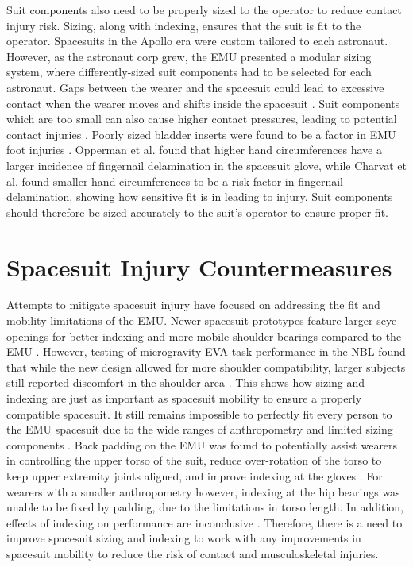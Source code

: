 \documentclass[defaultstyle,11pt]{comps}
\begin{document}
Suit components also need to be properly sized to the operator to reduce contact injury risk.
Sizing, along with indexing, ensures that the suit is fit to the operator.
Spacesuits in the Apollo era were custom tailored to each astronaut.
However, as the astronaut corp grew, the EMU presented a modular sizing system, where differently-sized suit components had to be selected for each astronaut.
Gaps between the wearer and the spacesuit could lead to excessive contact when the wearer moves and shifts inside the spacesuit \citep{Benson2009}.
Suit components which are too small can also cause higher contact pressures, leading to potential contact injuries \citep{Anderson2015b}.
Poorly sized bladder inserts were found to be a factor in EMU foot injuries \citep{Strauss2004}. Opperman et al. \citep{Opperman2010} found that higher hand circumferences have a larger incidence of fingernail delamination in the spacesuit glove, while Charvat et al. \citep{Charvat2015} found smaller hand circumferences to be a risk factor in fingernail delamination, showing how sensitive fit is in leading to injury.
Suit components should therefore be sized accurately to the suit's operator to ensure proper fit.

\hypertarget{spacesuit-injury-countermeasures}{%
\section{Spacesuit Injury Countermeasures}\label{spacesuit-injury-countermeasures}}

Attempts to mitigate spacesuit injury have focused on addressing the fit and mobility limitations of the EMU.
Newer spacesuit prototypes feature larger scye openings for better indexing and more mobile shoulder bearings compared to the EMU \citep{Graziosi2016}.
However, testing of microgravity EVA task performance in the NBL found that while the new design allowed for more shoulder compatibility, larger subjects still reported discomfort in the shoulder area \citep{Meginnis2018}.
This shows how sizing and indexing are just as important as spacesuit mobility to ensure a properly compatible spacesuit.
It still remains impossible to perfectly fit every person to the EMU spacesuit due to the wide ranges of anthropometry and limited sizing components \citep{Benson2009}.
Back padding on the EMU was found to potentially assist wearers in controlling the upper torso of the suit, reduce over-rotation of the torso to keep upper extremity joints aligned, and improve indexing at the gloves \citep{Chappell2017}.
For wearers with a smaller anthropometry however, indexing at the hip bearings was unable to be fixed by padding, due to the limitations in torso length.
In addition, effects of indexing on performance are inconclusive \citep{Fineman2018}.
Therefore, there is a need to improve spacesuit sizing and indexing to work with any improvements in spacesuit mobility to reduce the risk of contact and musculoskeletal injuries.
\end{document}
